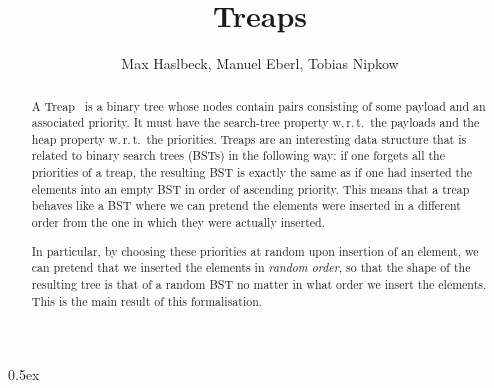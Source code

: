 \documentclass[11pt,a4paper]{article}
\begin{document}
\title{Treaps}
\author{Max Haslbeck, Manuel Eberl, Tobias Nipkow}
\maketitle

\begin{abstract}
A Treap~\cite{seidel1996} is a binary tree whose nodes contain pairs consisting of some payload and an associated priority. It must have the search-tree property w.\,r.\,t.\ the payloads and the heap property w.\,r.\,t.\ the priorities. Treaps are an interesting data structure that is related to binary search trees (BSTs) in the following way: if one forgets all the priorities of a treap, the resulting BST is exactly the same as if one had inserted the elements into an empty BST in order of ascending priority. This means that a treap behaves like a BST where we can pretend the elements were inserted in a different order from the one in which they were actually inserted.

In particular, by choosing these priorities at random upon insertion of an element, we can pretend that we inserted the elements in \emph{random order}, so that the shape of the resulting tree is that of a random BST no matter in what order we insert the elements. This is the main result of this formalisation.~\cite{eberl18}
\end{abstract}

\tableofcontents
\newpage
\parindent 0pt\parskip 0.5ex





\end{document}
